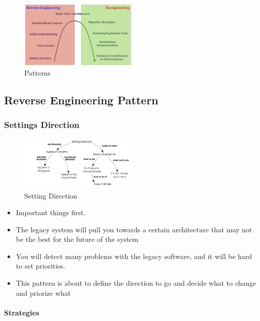 \begin{figure}[H]
\centering
\includegraphics[width=0.5\textwidth]{figures/rePatterns.png}
\caption{Patterns}
\end{figure}


\subsection{Reverse Engineering Pattern}

\hypertarget{settings-direction}{%
\subsubsection{Settings Direction}\label{settings-direction}}
\begin{figure}[H]
\centering
\includegraphics[width=0.5\textwidth]{figures/ReverseEngineering.PNG}
\caption{Setting Direction}
\end{figure}

\begin{itemize}
\tightlist
\item
    Important things first.
\item
  The legacy system will pull you towards a certain architecture that
  may not be the best for the future of the system
\item
  You will detect many problems with the legacy software, and it will be
  hard to set priorities.
\item
  This pattern is about to define the direction to go and decide what to
  change and priorize what
\end{itemize}

\hypertarget{strategies}{%
\paragraph{Strategies}\label{strategies}}

